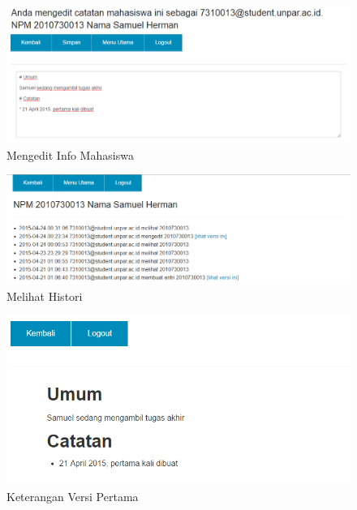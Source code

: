 \begin{figure}[H]
\centering
\includegraphics[scale=0.6]{Gambar/pengujian10.png}
\caption[Mengedit Info Mahasiswa]{Mengedit Info Mahasiswa} 
\label{fig:mengeditinfomahasiswa}
\end{figure}

\begin{figure}[H]
\centering
\includegraphics[scale=0.6]{Gambar/pengujian11.png}
\caption[Melihat Histori]{Melihat Histori} 
\label{fig:melihathistori}
\end{figure}

\begin{figure}[H]
\centering
\includegraphics[scale=1]{Gambar/pengujian12.png}
\caption[Keterangan Versi Pertama]{Keterangan Versi Pertama} 
\label{fig:keteranganversipertama}
\end{figure}

